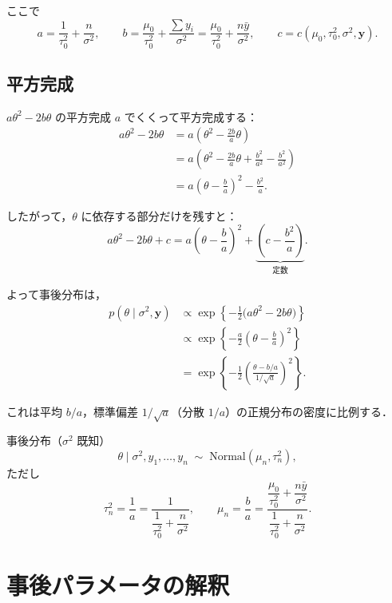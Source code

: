 \documentclass[lualatex,ja=standard,a4paper,12pt]{bxjsarticle}
\begin{document}
ここで
\[
  a = \frac{1}{\tau_0^2} + \frac{n}{\sigma^2}, \qquad
  b = \frac{\mu_0}{\tau_0^2} + \frac{\sum y_i}{\sigma^2} = \frac{\mu_0}{\tau_0^2} + \frac{n\bar{y}}{\sigma^2}, \qquad
  c = c(\mu_0, \tau_0^2, \sigma^2, \mathbf{y}).
\]

\subsection{平方完成}

\begin{derivbox}{$a\theta^2 - 2b\theta$ の平方完成}
$a$ でくくって平方完成する：
\begin{align*}
  a\theta^2 - 2b\theta
  &= a\!\left(\theta^2 - \frac{2b}{a}\theta\right) \\
  &= a\!\left(\theta^2 - \frac{2b}{a}\theta + \frac{b^2}{a^2} - \frac{b^2}{a^2}\right) \\
  &= a\!\left(\theta - \frac{b}{a}\right)^2 - \frac{b^2}{a}.
\end{align*}

したがって，$\theta$ に依存する部分だけを残すと：
\[
  a\theta^2 - 2b\theta + c = a\!\left(\theta - \frac{b}{a}\right)^2 + \underbrace{\left(c - \frac{b^2}{a}\right)}_{\text{定数}}.
\]
\end{derivbox}

よって事後分布は，
\begin{align*}
  p(\theta \mid \sigma^2, \mathbf{y})
  &\propto \exp\!\left\{-\frac{1}{2}\bigl(a\theta^2 - 2b\theta\bigr)\right\} \\
  &\propto \exp\!\left\{-\frac{a}{2}\left(\theta - \frac{b}{a}\right)^2\right\} \\
  &= \exp\!\left\{-\frac{1}{2}\left(\frac{\theta - b/a}{1/\sqrt{a}}\right)^2\right\}.
\end{align*}

これは平均 $b/a$，標準偏差 $1/\sqrt{a}$（分散 $1/a$）の正規分布の密度に比例する．

\begin{thmbox}{事後分布（$\sigma^2$ 既知）}
\[
  \theta \mid \sigma^2, y_1, \ldots, y_n
  \;\sim\; \mathrm{Normal}(\mu_n, \tau_n^2),
\]
ただし
\[
  \tau_n^2 = \frac{1}{a} = \frac{1}{\dfrac{1}{\tau_0^2} + \dfrac{n}{\sigma^2}},
  \qquad
  \mu_n = \frac{b}{a} = \frac{\dfrac{\mu_0}{\tau_0^2} + \dfrac{n\bar{y}}{\sigma^2}}{\dfrac{1}{\tau_0^2} + \dfrac{n}{\sigma^2}}.
\]
\end{thmbox}


\section{事後パラメータの解釈}
\end{document}
